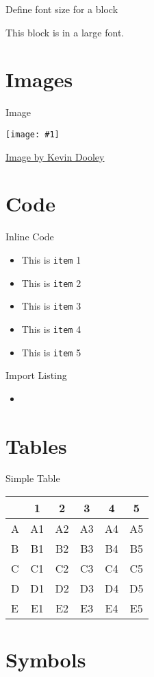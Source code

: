 \documentclass{beamer}
\newcommand{\code}[1]{\texttt{#1}}
\newcommand{\listing}[1]{
	\begin{itemize}
		\item[]
	\end{itemize}
}
\newcommand{\myfig}[2]{
	\begin{minipage}[c]{\textwidth}
		\begin{center}
			\texttt{[image: \#1]}
		\end{center}
		\vspace{3mm}
	\end{minipage}
}
\newcommand{\slideItems}[1]{
	\begin{itemize}
		#1
	\end{itemize}
}
\newcommand{\slide}[2]{
	\begin{frame}{#1}
		#2
	\end{frame}
}
\begin{document}
\slide{Define font size for a block}{
	\begin{LARGE}
		This block is in a large font.
	\end{LARGE}
}

\section{Images}

\slide{Image}{
	\myfig{cat.jpg}{1}
	\tiny{\href{https://www.flickr.com/photos/pagedooley/3372925208}{Image by Kevin Dooley}}
}

\section{Code}

\slide{Inline Code}{
	\slideItems{
		\item This is \code{item} 1
		\item This is \code{item} 2
		\item This is \code{item} 3
		\item This is \code{item} 4
		\item This is \code{item} 5
	}
}

\slide{Import Listing}{
	\listing{Listing.java}
}

\section{Tables}

\slide{Simple Table}{
	\begin{center}
		\begin{tabular}{ l || c | c | c | c | c }
			& 1 & 2 & 3 & 4 & 5 \\
			\hline
			\hline
			A & A1 & A2 & A3 & A4 & A5 \\
			B & B1 & B2 & B3 & B4 & B5 \\
			C & C1 & C2 & C3 & C4 & C5 \\
			D & D1 & D2 & D3 & D4 & D5 \\
			E & E1 & E2 & E3 & E4 & E5 \\
			\hline
			\hline
		\end{tabular}
	\end{center}
}

\section{Symbols}
\end{document}
